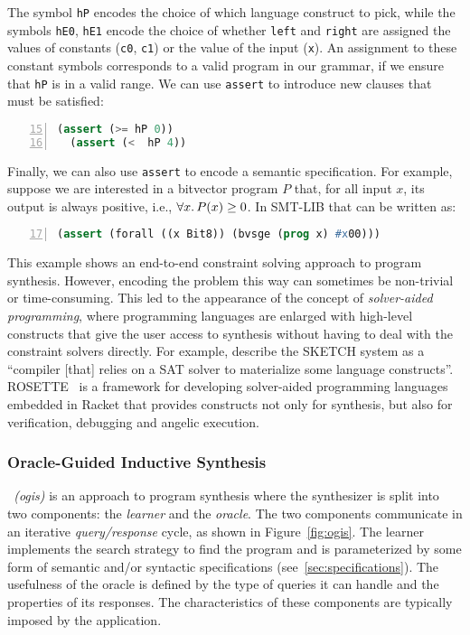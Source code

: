 %
The symbol \texttt{hP} encodes the choice of which language construct to pick,
while the symbols \texttt{hE0}, \texttt{hE1} encode the choice of whether
\texttt{left} and \texttt{right} are assigned the values of constants
(\texttt{c0}, \texttt{c1}) or the value of the input (\texttt{x}).
An assignment to these constant symbols corresponds to a valid program in our
grammar, if we ensure that \texttt{hP} is in a valid range.
We can use \texttt{assert} to introduce new clauses that must be satisfied:
%
\begin{lstlisting}[language=Lisp,
  numbers=left,
  firstnumber=15,
  morekeywords={assert}]
  (assert (>= hP 0))
  (assert (<  hP 4))
\end{lstlisting}
%
Finally, we can also use \texttt{assert} to encode a semantic specification.
For example, suppose we are interested in a bitvector program $P$ that, for all
input $x$, its output is always positive, i.e., $\forall x\ldotp P(x) \geq 0$.
In SMT-LIB that can be written as:
%
\begin{lstlisting}[language=Lisp,
  numbers=left,
  firstnumber=17,
  morekeywords={assert}]
  (assert (forall ((x Bit8)) (bvsge (prog x) #x00)))
\end{lstlisting}
 
This example shows an end-to-end constraint solving approach to program
synthesis. However, encoding the problem this way can sometimes be non-trivial
or time-consuming.
This led to the appearance of the concept of \textit{solver-aided programming},
where programming languages are enlarged with high-level constructs that give
the user access to synthesis without having to deal with the constraint solvers
directly.
For example, \citeauthor{Gulwani2017} describe the SKETCH system as a ``compiler
[that] relies on a SAT solver to materialize some language constructs''.
ROSETTE~\cite{Torlak:2013:GSL} is a framework for developing solver-aided
programming languages embedded in Racket that provides constructs not only for
synthesis, but also for verification, debugging and angelic execution.

\subsubsection{Oracle-Guided Inductive Synthesis}
\label{sec:ogis}

\textit{~(\Gls{ogis})} is an approach to program synthesis
where the synthesizer is split into two components: the \textit{learner} and the
\textit{oracle}.
The two components communicate in an iterative \textit{query/response} cycle, as
shown in Figure~\ref{fig:ogis}.
The learner implements the search strategy to find the program and is
parameterized by some form of semantic and/or syntactic specifications
(see~\ref{sec:specifications}).
The usefulness of the oracle is defined by the type of queries it can handle and
the properties of its responses. The characteristics of these components are
typically imposed by the application.

